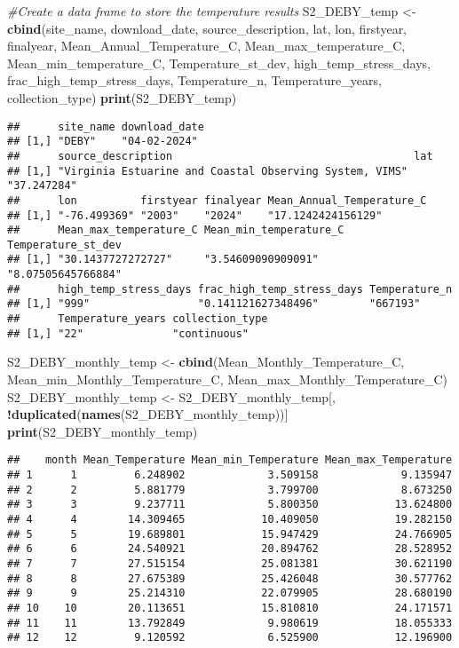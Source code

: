 \documentclass[
]{article}
\newenvironment{Shaded}{\begin{snugshade}}{\end{snugshade}}
\newcommand{\CommentTok}[1]{\textcolor[rgb]{0.56,0.35,0.01}{\textit{#1}}}
\newcommand{\FunctionTok}[1]{\textcolor[rgb]{0.13,0.29,0.53}{\textbf{#1}}}
\newcommand{\NormalTok}[1]{#1}
\newcommand{\OtherTok}[1]{\textcolor[rgb]{0.56,0.35,0.01}{#1}}
\newcommand{\SpecialCharTok}[1]{\textcolor[rgb]{0.81,0.36,0.00}{\textbf{#1}}}
\begin{document}
\begin{Shaded}
\begin{Highlighting}[]
\CommentTok{\#Create a data frame to store the temperature results}
\NormalTok{S2\_DEBY\_temp }\OtherTok{\textless{}{-}} \FunctionTok{cbind}\NormalTok{(site\_name, download\_date, source\_description, lat, lon, firstyear, finalyear, Mean\_Annual\_Temperature\_C, Mean\_max\_temperature\_C, Mean\_min\_temperature\_C, Temperature\_st\_dev, high\_temp\_stress\_days, frac\_high\_temp\_stress\_days, Temperature\_n, Temperature\_years, collection\_type)}
\FunctionTok{print}\NormalTok{(S2\_DEBY\_temp)}
\end{Highlighting}
\end{Shaded}

\begin{verbatim}
##      site_name download_date
## [1,] "DEBY"    "04-02-2024" 
##      source_description                                      lat        
## [1,] "Virginia Estuarine and Coastal Observing System, VIMS" "37.247284"
##      lon          firstyear finalyear Mean_Annual_Temperature_C
## [1,] "-76.499369" "2003"    "2024"    "17.1242424156129"       
##      Mean_max_temperature_C Mean_min_temperature_C Temperature_st_dev
## [1,] "30.1437727272727"     "3.54609090909091"     "8.07505645766884"
##      high_temp_stress_days frac_high_temp_stress_days Temperature_n
## [1,] "999"                 "0.141121627348496"        "667193"     
##      Temperature_years collection_type
## [1,] "22"              "continuous"
\end{verbatim}

\begin{Shaded}
\begin{Highlighting}[]
\NormalTok{S2\_DEBY\_monthly\_temp }\OtherTok{\textless{}{-}} \FunctionTok{cbind}\NormalTok{(Mean\_Monthly\_Temperature\_C, Mean\_min\_Monthly\_Temperature\_C, Mean\_max\_Monthly\_Temperature\_C)}
\NormalTok{S2\_DEBY\_monthly\_temp }\OtherTok{\textless{}{-}}\NormalTok{ S2\_DEBY\_monthly\_temp[, }\SpecialCharTok{!}\FunctionTok{duplicated}\NormalTok{(}\FunctionTok{names}\NormalTok{(S2\_DEBY\_monthly\_temp))]}
\FunctionTok{print}\NormalTok{(S2\_DEBY\_monthly\_temp)}
\end{Highlighting}
\end{Shaded}

\begin{verbatim}
##    month Mean_Temperature Mean_min_Temperature Mean_max_Temperature
## 1      1         6.248902             3.509158             9.135947
## 2      2         5.881779             3.799700             8.673250
## 3      3         9.237711             5.800350            13.624800
## 4      4        14.309465            10.409050            19.282150
## 5      5        19.689801            15.947429            24.766905
## 6      6        24.540921            20.894762            28.528952
## 7      7        27.515154            25.081381            30.621190
## 8      8        27.675389            25.426048            30.577762
## 9      9        25.214310            22.079905            28.680190
## 10    10        20.113651            15.810810            24.171571
## 11    11        13.792849             9.980619            18.055333
## 12    12         9.120592             6.525900            12.196900
\end{verbatim}
\end{document}
